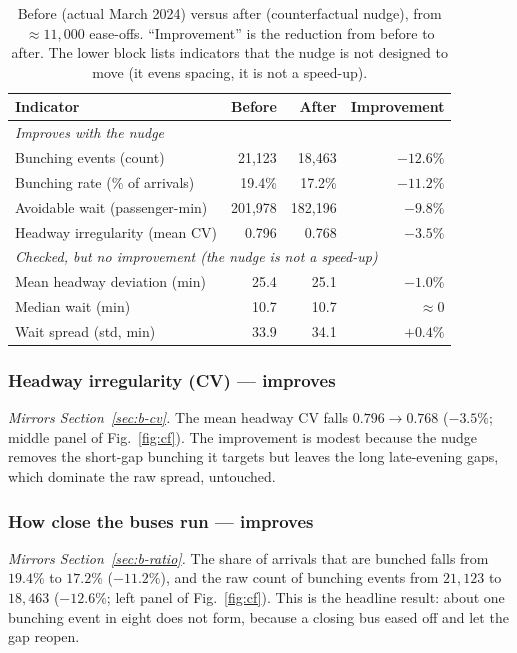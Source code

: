 \documentclass[final,5p,times,twocolumn,authoryear]{elsarticle}
\begin{document}
\begin{table}[t]
\centering
\small
\caption{Before (actual March 2024) versus after (counterfactual nudge), from $\approx$$11{,}000$
ease-offs. ``Improvement'' is the reduction from before to after. The lower block lists indicators
that the nudge is not designed to move (it evens spacing, it is not a speed-up).}
\label{tab:panel}
\begin{tabular}{lrrr}
\toprule
Indicator & Before & After & Improvement \\
\midrule
\multicolumn{4}{l}{\textit{Improves with the nudge}}\\
Bunching events (count)            & 21{,}123 & 18{,}463 & $-12.6\%$ \\
Bunching rate (\% of arrivals)     & 19.4\%   & 17.2\%   & $-11.2\%$ \\
Avoidable wait (passenger-min)     & 201{,}978& 182{,}196& $-9.8\%$  \\
Headway irregularity (mean CV)     & 0.796    & 0.768    & $-3.5\%$  \\
\midrule
\multicolumn{4}{l}{\textit{Checked, but no improvement (the nudge is not a speed-up)}}\\
Mean headway deviation (min)       & 25.4     & 25.1     & $-1.0\%$  \\
Median wait (min)                  & 10.7     & 10.7     & $\approx 0$ \\
Wait spread (std, min)             & 33.9     & 34.1     & $+0.4\%$  \\
\bottomrule
\end{tabular}
\end{table}

\subsubsection{Headway irregularity (CV) --- improves}
\label{sec:a-cv}
\emph{Mirrors Section~\ref{sec:b-cv}.} The mean headway $\mathrm{CV}$ falls $0.796 \to 0.768$
($-3.5\%$; middle panel of Fig.~\ref{fig:cf}). The improvement is modest because the nudge removes the
short-gap bunching it targets but leaves the long late-evening gaps, which dominate the raw spread,
untouched.

\subsubsection{How close the buses run --- improves}
\label{sec:a-ratio}
\emph{Mirrors Section~\ref{sec:b-ratio}.} The share of arrivals that are bunched falls from $19.4\%$
to $17.2\%$ ($-11.2\%$), and the raw count of bunching events from $21{,}123$ to $18{,}463$
($-12.6\%$; left panel of Fig.~\ref{fig:cf}). This is the headline result: about one bunching event in
eight does not form, because a closing bus eased off and let the gap reopen.
\end{document}
